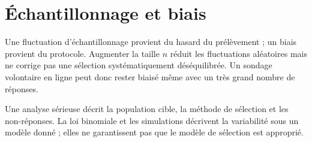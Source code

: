 \section{Échantillonnage et biais}
Une fluctuation d'échantillonnage provient du hasard du prélèvement ; un biais provient du protocole. Augmenter la taille $n$ réduit les fluctuations aléatoires mais ne corrige pas une sélection systématiquement déséquilibrée. Un sondage volontaire en ligne peut donc rester biaisé même avec un très grand nombre de réponses.

Une analyse sérieuse décrit la population cible, la méthode de sélection et les non-réponses. La loi binomiale et les simulations décrivent la variabilité sous un modèle donné ; elles ne garantissent pas que le modèle de sélection est approprié.
